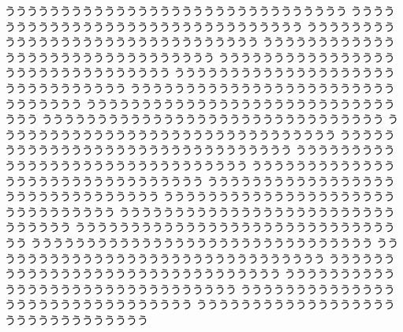 \begin{breakDbox}
ううううううううううううううううううううううううううううううう
ううううううううううううううううううううううううううううううう
ううううううううううううううううううううううううううううううう
ううううううううううううううううううううううううううううううう
ううううううううううううううううううううううううううううううう
ううううううううううううううううううううううううううううううう
ううううううううううううううううううううううううううううううう
ううううううううううううううううううううううううううううううう
ううううううううううううううううううううううううううううううう
ううううううううううううううううううううううううううううううう
ううううううううううううううううううううううううううううううう
ううううううううううううううううううううううううううううううう
ううううううううううううううううううううううううううううううう
ううううううううううううううううううううううううううううううう
ううううううううううううううううううううううううううううううう
ううううううううううううううううううううううううううううううう
ううううううううううううううううううううううううううううううう
ううううううううううううううううううううううううううううううう
ううううううううううううううううううううううううううううううう
ううううううううううううううううううううううううううううううう
ううううううううううううううううううううううううううううううう
ううううううううううううううううううううううううううううううう
ううううううううううううううううううううううううううううううう
\end{breakDbox}

